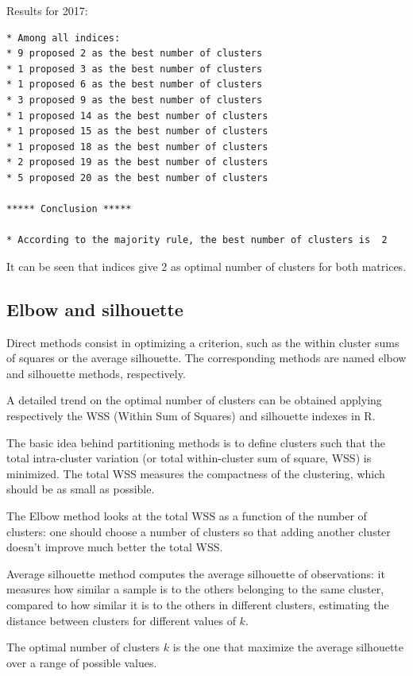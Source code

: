 Results for 2017:
\begin{lstlisting}
* Among all indices:                                                
* 9 proposed 2 as the best number of clusters 
* 1 proposed 3 as the best number of clusters 
* 1 proposed 6 as the best number of clusters 
* 3 proposed 9 as the best number of clusters 
* 1 proposed 14 as the best number of clusters 
* 1 proposed 15 as the best number of clusters 
* 1 proposed 18 as the best number of clusters 
* 2 proposed 19 as the best number of clusters 
* 5 proposed 20 as the best number of clusters 

***** Conclusion *****                            

* According to the majority rule, the best number of clusters is  2 
\end{lstlisting}

It can be seen that indices give 2 as optimal number of clusters for both matrices.

\subsection{Elbow and silhouette}
Direct methods consist in optimizing a criterion, such as the within cluster sums of squares or the average silhouette. The corresponding methods are named elbow and silhouette methods, respectively.

A detailed trend on the optimal number of clusters can be obtained applying respectively the WSS (Within Sum of Squares) and silhouette indexes in R.

The basic idea behind partitioning methods is to define clusters such that the total intra-cluster variation (or total within-cluster sum of square, WSS) is minimized. The total WSS measures the compactness of the clustering, which should be as small as possible.

The Elbow method looks at the total WSS as a function of the number of clusters: one should choose a number of clusters so that adding another cluster doesn't improve much better the total WSS.

Average silhouette method computes the average silhouette of observations: it measures how similar a sample is to the others belonging to the same cluster, compared to how similar it is to the others in different clusters, estimating the distance between clusters for different values of $k$.

The optimal number of clusters $k$ is the one that maximize the average silhouette over a range of possible values\cite{silhouette}.

